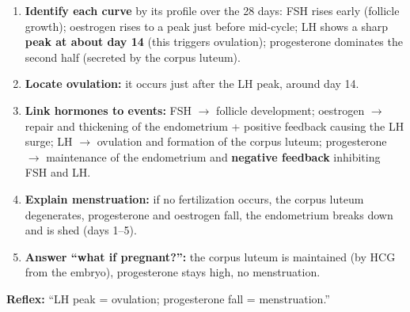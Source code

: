 \documentclass[11pt]{article}
\newcommand{\cle}[1]{{\popxbold\color{popdark}#1}}
\begin{document}
\begin{methode}
\begin{enumerate}
\item \textbf{Identify each curve} by its profile over the 28 days: \cle{FSH} rises early (follicle growth); \cle{oestrogen} rises to a peak just before mid-cycle; \cle{LH} shows a sharp \textbf{peak at about day 14} (this triggers ovulation); \cle{progesterone} dominates the second half (secreted by the corpus luteum).
\item \textbf{Locate ovulation:} it occurs just after the LH peak, around \cle{day 14}.
\item \textbf{Link hormones to events:} FSH $\to$ follicle development; oestrogen $\to$ repair and thickening of the endometrium + positive feedback causing the LH surge; LH $\to$ ovulation and formation of the corpus luteum; progesterone $\to$ maintenance of the endometrium and \textbf{negative feedback} inhibiting FSH and LH.
\item \textbf{Explain menstruation:} if no fertilization occurs, the corpus luteum degenerates, progesterone and oestrogen fall, the endometrium breaks down and is shed (days 1--5).
\item \textbf{Answer ``what if pregnant?'':} the corpus luteum is maintained (by HCG from the embryo), progesterone stays high, no menstruation.
\end{enumerate}
\textbf{Reflex:} ``LH peak = ovulation; progesterone fall = menstruation.''
\end{methode}
\end{document}
